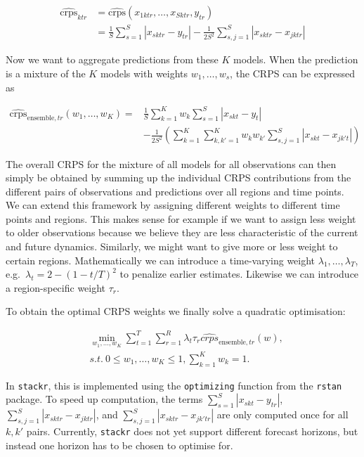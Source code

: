 \documentclass[
]{book}
\begin{document}
\begin{align*}
 \widehat {\text{crps}}_{ktr} &= \widehat {\text{crps}}(x_{1ktr}, \dots, x_{Sktr},y_{tr}) \\
 &= \frac{1}{S} \sum_{s=1}^S  |x_{sktr}-y_{tr}| - \frac{1}{2S^2} \sum_{s, j=1}^S |x_{sktr}- x_{jktr}|
\end{align*}

Now we want to aggregate predictions from these \(K\) models. When the prediction is a mixture of the \(K\)
models with weights \(w_1, \dots, w_s\), the CRPS can be expressed as

\begin{align*}
 \widehat {\text{crps}}_{\text{ensemble}, tr} (w_1, \dots, w_K) 
 =& \frac{1}{S} \sum_{k=1}^K w_k  \sum_{s=1}^S |x_{skt}-y_t| \\
 &- \frac{1}{2S^2}  (\sum_{k=1}^K   \sum_{k, k'=1 }^K w_k w_{k'}   \sum_{s, j=1}^S |x_{skt}- x_{jk't}| )
\end{align*}

The overall CRPS for the mixture of all models for all observations can then simply be obtained by summing up the individual CRPS contributions from the different pairs of observations and predictions over all regions and time points. We can extend this framework by assigning different weights to different time points and regions. This makes sense for example if we want to assign less weight to older observations because we believe they are less characteristic of the current and future dynamics. Similarly, we might want to give more or less weight to certain regions. Mathematically we can introduce a time-varying weight \(\lambda_1, \dots, \lambda_T\), e.g.~\(\lambda_t = 2-(1-t/T)^2\) to penalize earlier estimates. Likewise we can introduce a region-specific weight \(\tau_r\).

To obtain the optimal CRPS weights we finally solve a quadratic optimisation:

\begin{align*}
 &\min_{w_1, \dots, w_K} \sum_{t=1}^T  \sum_{r=1}^R\lambda_t\tau_r  \widehat {crps}_{\text{ensemble}, tr} (w), \\
  &s.t. ~{0\leq w_1, \dots, w_K \leq 1, \sum_{k=1}^K w_k=1}. 
\end{align*}

In \texttt{stackr}, this is implemented using the \texttt{optimizing} function from the \texttt{rstan} \citep{R-rstan} package. To speed up computation, the terms \(\sum_{s=1}^S |x_{skt}-y_{tr}|\), \(\sum_{s, j=1}^S |x_{sktr}- x_{jktr}|\), and \(\sum_{s, j=1}^S |x_{sktr}- x_{jk'tr}|\) are only computed once for all \(k, k'\) pairs. Currently, \texttt{stackr} does not yet support different forecast horizons, but instead one horizon has to be chosen to optimise for.
\end{document}
